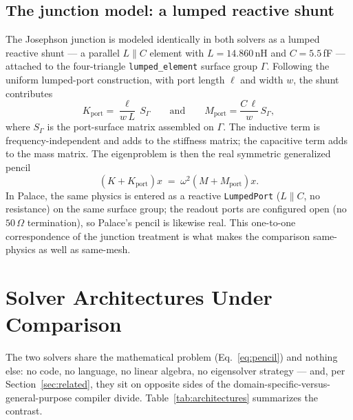\documentclass{anvil-paper}
\begin{document}
\subsection{The junction model: a lumped reactive shunt}
\label{sec:junction}

The Josephson junction is modeled identically in both solvers as a lumped
reactive shunt --- a parallel $L \parallel C$ element with
$L = 14.860$\,nH and $C = 5.5$\,fF --- attached to the four-triangle
\texttt{lumped\_element} surface group $\Gamma$. Following the uniform
lumped-port construction, with port length $\ell$ and width $w$, the shunt
contributes
\begin{equation}
  K_{\mathrm{port}} = \frac{\ell}{w\,L}\, S_\Gamma
  \qquad\text{and}\qquad
  M_{\mathrm{port}} = \frac{C\,\ell}{w}\, S_\Gamma ,
  \label{eq:port}
\end{equation}
where $S_\Gamma$ is the port-surface matrix assembled on $\Gamma$. The
inductive term is frequency-independent and adds to the stiffness matrix;
the capacitive term adds to the mass matrix. The eigenproblem is then the
real symmetric generalized pencil
\begin{equation}
  \left(K + K_{\mathrm{port}}\right) x
  \;=\; \omega^2 \left(M + M_{\mathrm{port}}\right) x .
  \label{eq:pencil}
\end{equation}
In Palace, the same physics is entered as a reactive \texttt{LumpedPort}
($L \parallel C$, no resistance) on the same surface group; the readout
ports are configured open (no $50\,\Omega$ termination), so Palace's pencil
is likewise real. This one-to-one correspondence of the junction treatment
is what makes the comparison same-physics as well as same-mesh.

\section{Solver Architectures Under Comparison}
\label{sec:solvers}

The two solvers share the mathematical problem
(Eq.~\ref{eq:pencil}) and nothing else: no code, no language, no linear
algebra, no eigensolver strategy --- and, per Section~\ref{sec:related},
they sit on opposite sides of the domain-specific-versus-general-purpose
compiler divide. Table~\ref{tab:architectures} summarizes the contrast.
\end{document}
